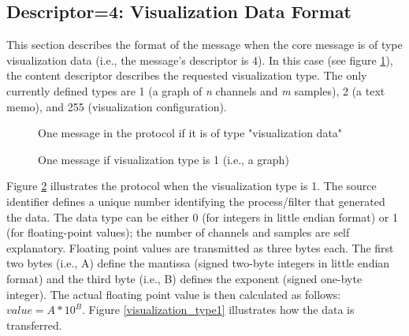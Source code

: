 \documentclass[letterpaper,oneside,12pt]{book}
\begin{document}
\subsection{Descriptor=4: Visualization Data Format}
\label{visualizationdata_format}

This section describes the format of the message when the core message is of 
type visualization data (i.e., the message's descriptor is 4). In this case (see 
figure \ref{visualizationprotocol}), the content descriptor describes the 
requested visualization type. The only currently defined types are 1 (a graph of 
\textit{n} channels and \textit{m} samples), 2 (a text memo), and 255 
(visualization configuration).

\begin{figure}[ht]
 \centerline{}
 \caption{One message in the protocol if it is of type "visualization data"}
 \label{visualizationprotocol}
\end{figure}

\begin{figure}[ht]
 \centerline{}
 \caption{One message if visualization type is 1 (i.e., a graph)}
 \label{visualizationprotocol_type1}
\end{figure}

Figure \ref{visualizationprotocol_type1} illustrates the protocol when the 
visualization type is 1. The source identifier defines a unique number 
identifying the process/filter that generated the data. The data type can be 
either 0 (for integers in little endian format) or 1 (for floating-point 
values); the number of channels and samples are self explanatory. Floating point 
values are transmitted as three bytes each. The first two bytes (i.e., A) define 
the mantissa (signed two-byte integers in little endian format) and the third 
byte (i.e., B) defines the exponent (signed one-byte integer). The actual floating 
point value is then calculated as follows: $value=A*10^{B}$. Figure 
\ref{visualization_type1} illustrates how the data is transferred.
\end{document}
